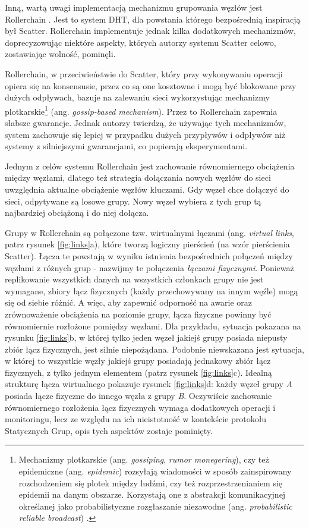 \documentclass[12pt, twoside, openany]{report}
\begin{document}
Inną, wartą uwagi implementacją mechanizmu grupowania węzłów jest Rollerchain \cite{bib:rollerchain}. Jest to system DHT, dla powstania którego bezpośrednią inspiracją był Scatter. Rollerchain implementuje jednak kilka dodatkowych mechanizmów, doprecyzowując niektóre aspekty, których autorzy systemu Scatter celowo, zostawiając wolność, pominęli.

Rollerchain, w przeciwieństwie do Scatter, który przy wykonywaniu operacji opiera się na konsensusie, przez co są one kosztowne i mogą być blokowane przy dużych odpływach, bazuje na zalewaniu sieci wykorzystując mechanizmy plotkarskie\footnote{Mechanizmy plotkarskie (ang. \textit{gossiping}, \textit{rumor monegering}), czy też epidemiczne (ang. \textit{epidemic}) rozsyłają wiadomości w sposób zainspirowany rozchodzeniem się plotek między ludźmi, czy też rozprzestrzenianiem się epidemii na danym obszarze. Korzystają one z abstrakcji komunikacyjnej określanej jako probabilistyczne rozgłaszanie niezawodne (ang. \textit{probabilistic reliable broadcast}) \cite{bib:pr}.} (ang. \textit{gossip-based mechanism}). Przez to Rollerchain zapewnia słabsze gwarancje. Jednak autorzy twierdzą, że używając tych mechanizmów, system zachowuje się lepiej w przypadku dużych przypływów i odpływów niż systemy z silniejszymi gwarancjami, co popierają eksperymentami.

Jednym z celów systemu Rollerchain jest zachowanie równomiernego obciążenia między węzłami, dlatego też strategia dołączania nowych węzłów do sieci uwzględnia aktualne obciążenie węzłów kluczami. Gdy węzeł chce dołączyć do sieci, odpytywane są losowe grupy. Nowy węzeł wybiera z tych grup tą najbardziej obciążoną i do niej dołącza.

Grupy w Rollerchain są połączone tzw. wirtualnymi łączami (ang. \textit{virtual links}, patrz rysunek \ref{fig:links}a), które tworzą logiczny pierścień (na wzór pierścienia Scatter). Łącza te powstają w wyniku istnienia bezpośrednich połączeń między węzłami z różnych grup - nazwijmy te połączenia \textit{łączami fizycznymi}. Ponieważ replikowanie wszystkich danych na wszystkich członkach grupy nie jest wymagane, zbiory łącz fizycznych (każdy przechowywany na innym węźle) mogą się od siebie różnić. A więc, aby zapewnić odporność na awarie oraz zrównoważenie obciążenia na poziomie grupy, łącza fizyczne powinny być równomiernie rozłożone pomiędzy węzłami. Dla przykładu, sytuacja pokazana na rysunku \ref{fig:links}b, w której tylko jeden węzeł jakiejś grupy posiada niepusty zbiór łącz fizycznych, jest silnie niepożądana. Podobnie niewskazana jest sytuacja, w której to wszystkie węzły jakiejś grupy posiadają jednakowy zbiór łącz fizycznych, z tylko jednym elementem (patrz rysunek \ref{fig:links}c). Idealną strukturę łącza wirtualnego pokazuje rysunek \ref{fig:links}d: każdy węzeł grupy \textit{A} posiada łącze fizyczne do innego węzła z grupy \textit{B}. Oczywiście zachowanie równomiernego rozłożenia łącz fizycznych wymaga dodatkowych operacji i monitoringu, lecz ze względu na ich nieistotność w kontekście protokołu Statycznych Grup, opis tych aspektów zostaje pominięty.
\end{document}
